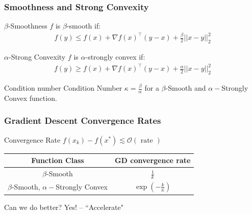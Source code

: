 \documentclass{beamer}
\newcommand\fontbig{\fontsize{15}{7.2}\selectfont}
\begin{document}
\begin{frame}
\frametitle{ Smoothness and Strong Convexity }

\begin{block}{$\beta$-Smoothness}
$f$ is $\beta$-smooth if:
\begin{align*}
f(y) \leq f(x) + \nabla f(x)^\top(y-x)+ \frac{\beta}{2} ||x - y||_2^2
\end{align*}
\end{block}



\begin{block}{$\alpha$-Strong Convexity}
$f$ is $\alpha$-strongly convex if:
\begin{align*}
f(y) \geq f(x) + \nabla f(x)^\top(y-x) + \frac{\alpha}{2} ||x - y||_2^2
\end{align*}
\end{block}

\begin{block}{Condition number}
Condition Number $\kappa = \frac{\beta}{\alpha}$ for a $\beta$-Smooth and $\alpha-$Strongly Convex function.
\end{block}
\end{frame}

\begin{frame}
\frametitle{Gradient Descent Convergence Rates}

\fontbig

\begin{block}{Convergence Rate}
$f(x_k) - f(x^*) \lesssim \mathcal{O}(\text{ rate })$ 
\end{block}

\fontbig

\begin{center}
 \begin{tabular}{||c c ||} 
 \hline
 Function Class  & GD convergence rate \\ [0.5ex] 
 \hline\hline
 $\beta$-Smooth  & $\frac{1 }{k}$  \\ [1ex]
 \hline
 $\beta$-Smooth, $\alpha-$Strongly Convex   & $\exp\left(-\frac{k}{\kappa}\right)$  \\[1ex]
 \hline
\end{tabular}

\end{center}

\fontbig

\begin{block}{Can we do better?}
Yes! -- ``Accelerate"
\end{block}

\end{frame}
\end{document}
